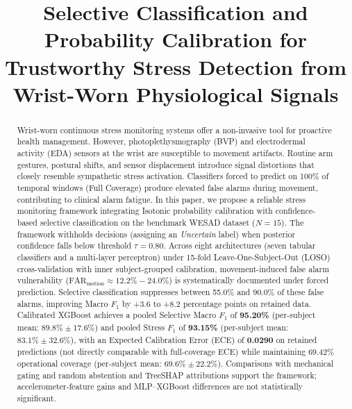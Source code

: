 \documentclass[conference]{IEEEtran}
\begin{document}
\title{Selective Classification and Probability Calibration for Trustworthy Stress Detection from Wrist-Worn Physiological Signals}

\author{
}

\maketitle

\begin{abstract}
Wrist-worn continuous stress monitoring systems offer a non-invasive tool for proactive health management. However, photoplethysmography (BVP) and electrodermal activity (EDA) sensors at the wrist are susceptible to movement artifacts. Routine arm gestures, postural shifts, and sensor displacement introduce signal distortions that closely resemble sympathetic stress activation. Classifiers forced to predict on 100\% of temporal windows (Full Coverage) produce elevated false alarms during movement, contributing to clinical alarm fatigue. In this paper, we propose a reliable stress monitoring framework integrating Isotonic probability calibration with confidence-based selective classification on the benchmark WESAD dataset ($N=15$). The framework withholds decisions (assigning an \textit{Uncertain} label) when posterior confidence falls below threshold $\tau = 0.80$. Across eight architectures (seven tabular classifiers and a multi-layer perceptron) under 15-fold Leave-One-Subject-Out (LOSO) cross-validation with inner subject-grouped calibration, movement-induced false alarm vulnerability ($\text{FAR}_{\text{motion}} \approx 12.2\% - 24.0\%$) is systematically documented under forced prediction. Selective classification suppresses between 55.0\% and 90.0\% of these false alarms, improving Macro $F_1$ by +3.6 to +8.2 percentage points on retained data. Calibrated XGBoost achieves a pooled Selective Macro $F_1$ of \textbf{95.20\%} (per-subject mean: $89.8\% \pm 17.6\%$) and pooled Stress $F_1$ of \textbf{93.15\%} (per-subject mean: $83.1\% \pm 32.6\%$), with an Expected Calibration Error (ECE) of \textbf{0.0290} on retained predictions (not directly comparable with full-coverage ECE) while maintaining $69.42\%$ operational coverage (per-subject mean: $69.6\% \pm 22.2\%$). Comparisons with mechanical gating and random abstention and TreeSHAP attributions support the framework; accelerometer-feature gains and MLP--XGBoost differences are not statistically significant.
\end{abstract}
\end{document}
